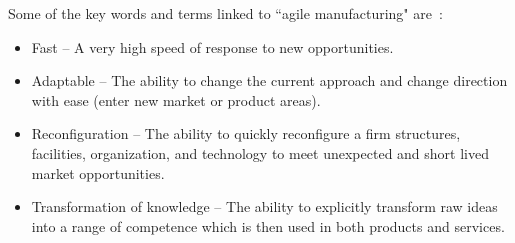\documentclass[final,3p,12pt]{elsarticle}
\begin{document}
Some of the key words and terms linked to ``agile manufacturing" are~\cite{KIDD.2000}:
\begin{itemize}
\item Fast -- A very high speed of response to new opportunities.
\item Adaptable -- The ability to change the current approach and change direction with ease (enter new market or product areas).
\item Reconfiguration -- The ability to quickly reconfigure a firm structures, facilities, organization, and technology to meet unexpected and short lived market opportunities.
\item Transformation of knowledge -- The ability to explicitly transform raw ideas into a range of competence which is then used in both products and services.
\end{itemize}









\end{document}
